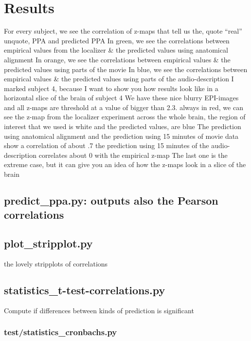 \section{Results}


%
For every subject, we see the correlation of z-maps that tell us the, quote
``real'' unquote, PPA and predicted PPA
%
In green, we see the correlations between empirical values from the localizer \&
the predicted values using anatomical alignment
%
In orange, we see the correlations between empirical values \& the predicted
values using parts of the movie
%
In blue, we see the correlations between empirical values \& the predicted
values using parts of the audio-description
%
I marked subject 4, because I want to show you how results look like in a
horizontal slice of the brain of subject 4
%
We have these nice blurry EPI-images and all z-maps are threshold at a value of
bigger than 2.3.
%
always in red, we can see the z-map from the localizer experiment across the
whole brain,
%
the region of interest that we used is white and the predicted values, are blue
%
The prediction using anatomical alignment and the prediction using 15 minutes of
movie data show a correlation of about .7
%
the prediction using 15 minutes of the audio-description correlates about 0 with
the empirical z-map
%
The last one is the extreme case, but it can give you an idea of how the z-maps
look in a slice of the brain


\subsection{predict\_ppa.py: outputs also the Pearson correlations}


\subsection{plot\_stripplot.py}

the lovely stripplots of correlations

\subsection{statistics\_t-test-correlations.py}

Compute if differences between kinds of prediction is significant


\subsubsection{test/statistics\_cronbachs.py}

